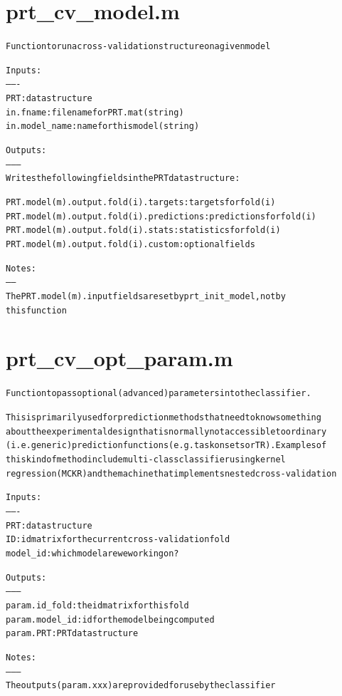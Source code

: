 \section{prt\_cv\_model.m}
\begin{alltt}

 Function to run a cross-validation structure on a given model
 
 Inputs:
 -------
 PRT:             data structure
 in.fname:        filename for PRT.mat (string)
 in.model\_name:   name for this model (string)
 
 Outputs:
 --------
 Writes the following fields in the PRT data structure:
 
 PRT.model(m).output.fold(i).targets:     targets for fold(i)
 PRT.model(m).output.fold(i).predictions: predictions for fold(i)
 PRT.model(m).output.fold(i).stats:       statistics for fold(i)
 PRT.model(m).output.fold(i).{custom}:    optional fields
 
 Notes:
 ------
 The PRT.model(m).input fields are set by prt\_init\_model, not by
 this function
 
\end{alltt}


\section{prt\_cv\_opt\_param.m}
\begin{alltt}

 Function to pass optional (advanced) parameters into the classifier. 
 
 This is primarily used for prediction methods that need to know something
 about the experimental design that is normally not accessible to ordinary
 (i.e. generic) prediction functions (e.g. task onsets or TR). Examples of
 this kind of method include multi-class classifier using kernel
 regression (MCKR) and the machine that implements nested cross-validation
 
 Inputs:
 -------
 PRT:      data structure
 ID:       id matrix for the current cross-validation fold
 model\_id: which model are we working on?
 
 Outputs:
 --------
 param.id\_fold:   the id matrix for this fold
 param.model\_id:  id for the model being computed
 param.PRT:       PRT data structure
 
 Notes:
 --------
 The outputs (param.xxx) are provided for use by the classifier
 
\end{alltt}


